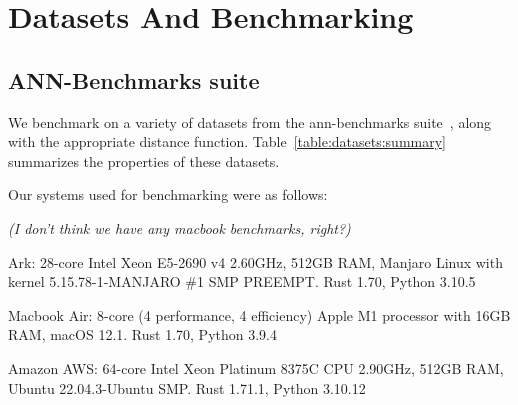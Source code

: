 
\section{Datasets And Benchmarking}
\label{sec:datasets-and-distance-functions}



\subsection{ANN-Benchmarks suite}
\label{subsec:datasets:ann-benchmarks-suite}

We benchmark on a variety of datasets from the ann-benchmarks suite~\cite{Aumller2018ANNBenchmarksAB}, 
along with the appropriate distance function.
Table~\ref{table:datasets:summary} summarizes the properties of these datasets.

Our systems used for benchmarking were as follows:

\emph{(I don't think we have any macbook benchmarks, right?)}

Ark: 28-core Intel Xeon E5-2690 v4 2.60GHz, 512GB RAM, Manjaro Linux with kernel 5.15.78-1-MANJARO \#1 SMP PREEMPT. Rust 1.70, Python 3.10.5

Macbook Air: 8-core (4 performance, 4 efficiency) Apple M1 processor with 16GB RAM, macOS 12.1. Rust 1.70, Python 3.9.4

Amazon AWS: 64-core Intel Xeon Platinum 8375C CPU 2.90GHz, 512GB RAM, Ubuntu 22.04.3-Ubuntu SMP. Rust 1.71.1, Python 3.10.12





